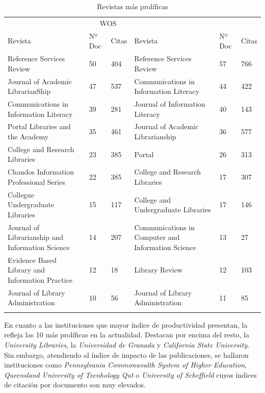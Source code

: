 \documentclass{textolivre}
\begin{document}
\begin{table}[h]
\caption{Revistas más prolíficas}
\label{tab2}
\centering
\scriptsize
\begin{tabular}{%
    >{\raggedright\arraybackslash}p{}%
    p{}%
    p{}%
    >{\raggedright\arraybackslash}p{}%
    p{}%
    p{}}
\toprule 
& \multicolumn{2}{c}{WOS} & & \multicolumn{2}{c}{Scopus}
\\
Revista	& Nº Doc & Citas & Revista & Nº Doc & Citas
\\
\midrule
\arrayrulecolor[gray]{.7}
Reference Services Review & 50 & 404 & Reference Services Review & 57 & 766
\\
Journal of Academic LibrarianShip & 47 & 537 & Communications in Information Literacy & 44 & 422
\\
Communications in Information Literacy & 39 & 281 & Journal of Information Literacy & 40 & 143
\\
Portal Libraries and the Academy & 35 & 461 & Journal of Academic Librarianship & 36 & 577
\\
College and Research Libraries & 23 & 385 & Portal & 26 & 313
\\
Chandos Information Professional Series & 22 & 385 & College and Research Libraries & 17 & 307
\\
Collegue Undergraduate Libraries & 15 & 117 & College and Undergraduate Libraries & 17 & 146
\\
Journal of Librarianship and Information Science & 14 & 207 & Communications in Computer and Information Science & 13 & 27
\\
Evidence Based Library and Information Practice & 12 & 18 & Library Review & 12 & 103
\\
Journal of Library Administration & 10 & 56 & Journal of Library Administration & 11 & 85
\\
\arrayrulecolor{black}
\bottomrule
\end{tabular}
\centering
{}
\end{table}

En cuanto a las instituciones que mayor índice de productividad presentan, la  refleja las 10 más prolíficas en la actualidad. Destacan por encima del resto, la \emph{University Libraries}, la \emph{Universidad de Granada} y \emph{California State University}. Sin embargo, atendiendo al índice de impacto de las publicaciones, se hallaron instituciones como \emph{Pennsylvania Commonwealth System of Higher Education}, \emph{Queensland University of Tecnhology Qut} o \emph{University of Scheffield}  cuyos índices de citación por documento son muy elevados.
\end{document}
